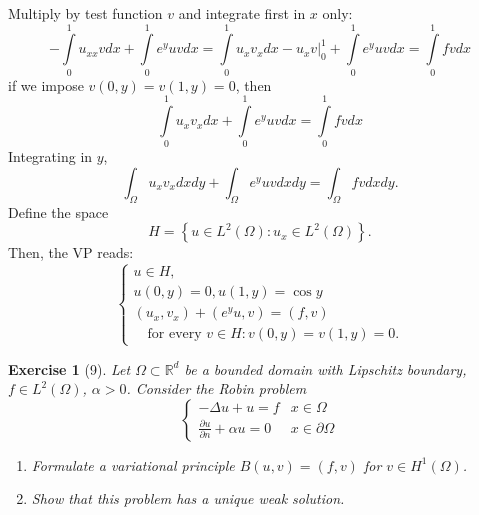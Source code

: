 \documentclass[letterpaper,twoside,11pt]{article}
\theoremstyle{mystyle}
\newtheorem*{exercise}{Exercise}
\newcommand{\R}{{\mathbb R}}
\begin{document}
Multiply by test function $v$ and integrate first in $x$ only: 
\[-\int\limits_0^1 u_{xx} v dx + \int\limits_0^1 e^y u v dx =\int\limits_0^1 u_{x} v_x  dx - u_xv|_0^1  + \int\limits_0^1 e^y u v dx= \int\limits_0^1 f vdx\]
if we impose $v(0, y) = v(1, y) = 0$, then 
\[\int\limits_0^1 u_{x} v_x  dx + \int\limits_0^1 e^y u v dx = \int\limits_0^1 fv dx\]
Integrating in $y$, 
\[\int_\Omega u_xv_x dx dy + \int_\Omega e^y u v dx dy= \int_\Omega f vdx dy. \]
Define the space 
\[H = \left\{ u \in L^2 (\Omega) : u_x \in L^2 (\Omega) \right\}.\] 
Then, the VP reads: 
\[\left\{ {\begin{array}{*{20}{l}}
  {u \in H,} \\[.2cm] 
  u\left( 0, y \right) = 0, u\left( 1, y \right) = \cos y \\[.2cm]
  \left( u_x, v_x \right) + \left( e^y u, v \right) = \left( f, v \right) \\[.2cm]
  \quad \text{for every } v\in H : v(0,y) = v(1, y) = 0.  
\end{array}} \right.\]



\begin{exercise}[9]
Let $\Omega\subset \R^d$ be a bounded domain with Lipschitz boundary, $f \in L^2 \left( \Omega \right)$, $\alpha > 0$. Consider the Robin problem
\[\left\{ {\begin{array}{*{20}{c}}
  { -\Delta u + u = f}&{x\in \Omega} \\[.2cm] 
  {\displaystyle \frac{\partial u}{\partial n }+ \alpha u = 0}&{x \in \partial \Omega} 
\end{array}} \right.\]
\begin{enumerate}
  \item Formulate a variational principle $B(u,v) = (f, v)$ for $v \in H^1 \left( \Omega \right)$. 
  \item Show that this problem has a unique weak solution. 
\end{enumerate}
\end{exercise}
\end{document}
